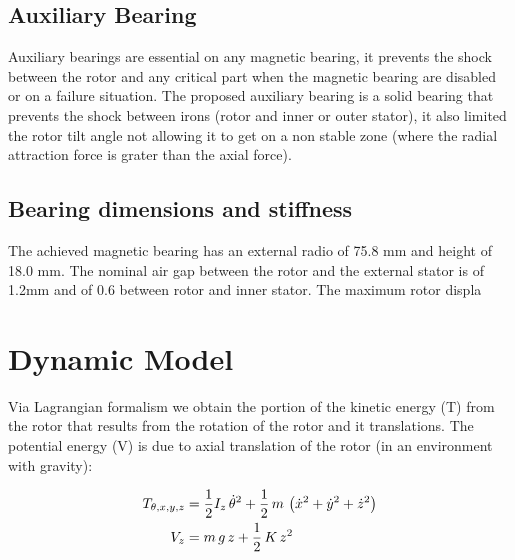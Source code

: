 \documentclass[10pt,fleqn,a4paper,twoside]{article}
\begin{document}
	\subsection{Auxiliary Bearing}
	
	Auxiliary bearings are essential on any magnetic bearing, it prevents the shock between the rotor and any critical part when the magnetic bearing are disabled or on a failure situation. The proposed auxiliary bearing is a solid bearing that prevents the shock between irons (rotor and inner or outer stator), it also limited the rotor tilt angle not allowing it to get on a non stable zone (where the radial attraction force is grater than the axial force). 
	
	
	
	\subsection{Bearing dimensions and stiffness}
	
	The achieved magnetic bearing has an external radio of 75.8 mm and height of 18.0 mm. The nominal air gap between the rotor and the external stator is of 1.2mm and of 0.6 between rotor and inner stator. The maximum rotor displa
	
	\section{Dynamic Model}
	
	Via Lagrangian formalism we obtain the portion of the kinetic energy (T) from the rotor that results from the rotation of the rotor and it translations. The potential energy (V) is due to axial translation of the rotor (in an environment with gravity): 
	
	\begin{align}
		T_{\theta, x, y, z} &= \frac{1}{2} I_z \, \dot{\theta}^2 + \frac{1}{2} \, m \, \left( \dot{x}^2 + \dot{y}^2 + \dot{z}^2 \right) \notag \\
		V_z &= m \, g \, z + \frac{1}{2} \, K \, z^2
	\end{align}
	
\end{document}
